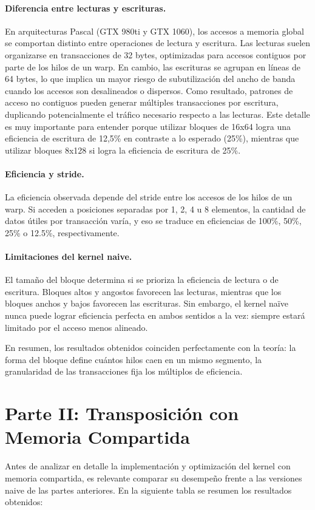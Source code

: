 \documentclass[a4paper,11pt]{article}
\begin{document}
\paragraph{Diferencia entre lecturas y escrituras.}
En arquitecturas Pascal (GTX 980ti y GTX 1060), los accesos a memoria global se comportan distinto entre operaciones de lectura y escritura. Las lecturas suelen organizarse en transacciones de 32 bytes, optimizadas para accesos contiguos por parte de los hilos de un warp. En cambio, las escrituras se agrupan en líneas de 64 bytes, lo que implica un mayor riesgo de subutilización del ancho de banda cuando los accesos son desalineados o dispersos. Como resultado, patrones de acceso no contiguos pueden generar múltiples transacciones por escritura, duplicando potencialmente el tráfico necesario respecto a las lecturas. Este detalle es muy importante para entender porque utilizar bloques de 16x64 logra una eficiencia de escritura de 12,5\% en contraste a lo esperado (25\%), mientras que utilizar bloques 8x128 si logra la eficiencia de escritura de 25\%.

\paragraph{Eficiencia y stride.}
La eficiencia observada depende del stride entre los accesos de los hilos de un warp. Si acceden a posiciones separadas por 1, 2, 4 u 8 elementos, la cantidad de datos útiles por transacción varía, y eso se traduce en eficiencias de 100\%, 50\%, 25\% o 12.5\%, respectivamente.

\paragraph{Limitaciones del kernel naive.}
El tamaño del bloque determina si se prioriza la eficiencia de lectura o de escritura. Bloques altos y angostos favorecen las lecturas, mientras que los bloques anchos y bajos favorecen las escrituras. Sin embargo, el kernel naïve nunca puede lograr eficiencia perfecta en ambos sentidos a la vez: siempre estará limitado por el acceso menos alineado.

En resumen, los resultados obtenidos coinciden perfectamente con la teoría: la forma del bloque define cuántos hilos caen en un mismo segmento, la granularidad de las transacciones fija los múltiplos de eficiencia.



\section{Parte II: Transposición con Memoria Compartida}
Antes de analizar en detalle la implementación y optimización del kernel con memoria compartida, es relevante comparar su desempeño frente a las versiones naive de las partes anteriores. En la siguiente tabla se resumen los resultados obtenidos:
\end{document}
